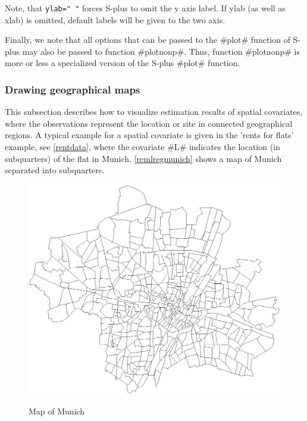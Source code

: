 Note, that \texttt{ylab=" "} forces S-plus to omit the y axis
label. If ylab (as well as xlab) is omitted, default labels will
be given to the two axis.

Finally, we note that all options that can be passed to the #plot#
function of S-plus may also be passed to function #plotnonp#.
Thus, function #plotnonp# is more or less a specialized version of
the S-plus #plot# function.

\subsubsection{Drawing geographical maps}
 

This subsection describes how to visualize estimation results of
spatial covariates, where the observations represent the location
or site in connected geographical regions. A typical example for a
spatial covariate is given in the 'rents for flats' example, see
\autoref{rentdata},  where the covariate #L# indicates the
location (in subquarters) of the flat in Munich.
\autoref{remlregmunich} shows a map of Munich separated into
subquarters.

\begin{figure}
\centering
\includegraphics [scale=0.5]{grafiken/munich.eps}
{\em \caption{\label{remlregmunich} Map of Munich}}
\end{figure}

